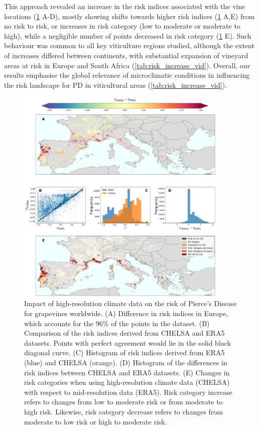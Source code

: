 This approach revealed an increase in the risk indices
associated with the vine locations (\cref{fig:risk_dif_vid} A-D), mostly
showing shifts towards higher risk indices (\cref{fig:risk_dif_vid} A,E) from
no risk to risk, or increases in risk category (low to moderate or moderate to
high), while a negligible number of points decreased in risk category
(\cref{fig:risk_dif_vid} E). Such behaviour was common to all key viticulture
regions studied, although the extent of increases differed between continents,
with substantial expansion of vineyard areas at risk in Europe and South Africa
(\cref{tab:risk_increase_vid}). Overall, our results emphasise the global
relevance of microclimatic conditions in influencing the risk landscape for PD
in viticultural areas (\cref{tab:risk_increase_vid}).

\begin{figure}[H]
    \centering

    \includegraphics[width=0.9\textwidth]{Figures/risk_difference_vineyards.pdf}
    \caption{Impact of high-resolution climate data on the risk of Pierce's
        Disease for grapevines worldwide. (A) Difference in risk indices in
        Europe,
        which accounts for the 96\% of the points in the dataset. (B)
        Comparison of the
        risk indices derived from CHELSA and ERA5 datasets. Points with perfect
        agreement would lie in the solid black diagonal curve. (C) Histogram of
        risk
        indices derived from ERA5 (blue) and CHELSA (orange). (D) Histogram of
        the
        differences in risk indices between CHELSA and ERA5 datasets. (E)
        Changes in
        risk categories when using high-resolution climate data (CHELSA) with
        respect
        to mid-resolution data (ERA5). Risk category increase refers to changes
        from
        low to moderate risk or from moderate to high risk. Likewise, risk
        category
        decrease refers to changes from moderate to low risk or high to
        moderate risk.}
    \label{fig:risk_dif_vid}
\end{figure}

